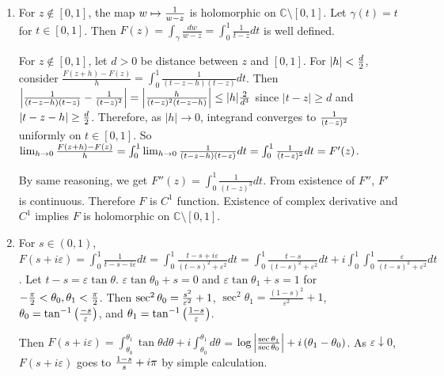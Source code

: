 \begin{problem}[2.3] \hfill
	\begin{enumerate}[label = (\alph*)]
		\item For $z \notin \left[ 0, 1 \right]$, the map $w \mapsto {1 \over w-z}$ is holomorphic on $\mathbb{C} \setminus \left[ 0, 1 \right]$. Let $\gamma(t) = t$ for $t \in \left[ 0, 1 \right]$. Then $F(z) = \int_\gamma \frac{dw}{w-z} = \int_0^1 \frac{1}{t-z}dt $ is well defined.

		 For $z \notin \left[ 0, 1 \right]$, let $d>0$ be distance between $z$ and $\left[ 0, 1 \right]$. For $|h| < {d \over 2}$, consider $\frac{F(z+h) - F(z)}{h} = \int_0^1 \frac{1}{(t-z-h)(t-z)}dt$. Then $\left | \frac{1}{(t-z-h)(t-z)} - \frac{1}{(t-z)^2} \right | = \left | \frac{h}{(t-z)^2(t-z-h)} \right | \leq |h| {2 \over d^3}$ since $|t-z| \geq d$ and $|t-z-h| \geq {d \over 2}$. Therefore, as $|h| \rightarrow 0$, integrand converges to ${1 \over (t-z)^2}$ uniformly on $t\in \left[ 0, 1 \right]$. So $\lim_{h\rightarrow 0}{F(z+h) - F(z) \over h} = \int_0^1\lim_{h\rightarrow 0}\frac{1}{(t-z-h)(t-z)}dt = \int_0^1 \frac{1}{(t-z)^2}dt = F'(z)$.

			By same reasoning, we get $F''(z) = \int_0^1 \frac{1}{(t-z)^3}dt$. From existence of $F''$, $F'$ is continuous. Therefore $F$ is $C^1$ function. Existence of complex derivative and $C^1$ implies $F$ is holomorphic on $\mathbb{C} \setminus \left[ 0, 1 \right]$. 

		\item For $s \in (0, 1)$, $F(s +i\varepsilon) = \int_0^1 \frac{1}{t-s-i\varepsilon}dt = \int_0^1 \frac{t-s+i\varepsilon}{(t-s)^2 +\varepsilon^2}dt = \int_0^1 \frac{t-s}{(t-s)^2 + \varepsilon^2}dt + i \int_0^1 \int_0^1 \frac{\varepsilon}{(t-s)^2 + \varepsilon^2}dt$. Let $t-s = \varepsilon \tan \theta$. $\varepsilon \tan \theta_0 + s = 0$ and $\varepsilon \tan \theta_1 + s = 1$ for $-{\pi \over 2 } < \theta_0, \theta_1 < {\pi\over 2}$.	
			Then $\sec ^2 \theta_0 = {s^2 \over \varepsilon^2}+1$, $\sec^2 \theta_1 = \frac{(1-s)^2}{\varepsilon^2}+1$, $\theta_0 = \tan^{-1}\left( {-s \over \varepsilon} \right)$, and $\theta_1 = \tan^{-1}\left( 1-s \over \varepsilon \right)$.

			Then $F(s+i\varepsilon) = \int_{\theta_0}^{\theta_1}\tan \theta d\theta + i \int_{\theta_0}^{\theta_1}d\theta$ = $\log \left | {\sec \theta_1 \over \sec \theta_0} \right | + i\left( \theta_1 - \theta_0 \right)$. As $\varepsilon \downarrow 0$, $F\left( s+i\varepsilon \right)$ goes to ${1-s \over s} + i\pi$ by simple calculation.


\end{enumerate}
\end{problem}
